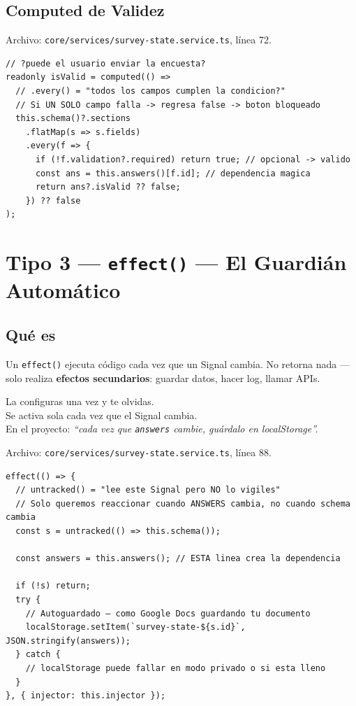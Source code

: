 \documentclass[12pt, a4paper]{article}
\begin{document}
\subsection{ Computed de Validez}
Archivo: \textcolor{morado}{\texttt{core/services/survey-state.service.ts}}, línea 72.

\begin{lstlisting}
// ?puede el usuario enviar la encuesta?
readonly isValid = computed(() =>
  // .every() = "todos los campos cumplen la condicion?"
  // Si UN SOLO campo falla -> regresa false -> boton bloqueado
  this.schema()?.sections
    .flatMap(s => s.fields)
    .every(f => {
      if (!f.validation?.required) return true; // opcional -> valido
      const ans = this.answers()[f.id]; // dependencia magica
      return ans?.isValid ?? false;
    }) ?? false
);
\end{lstlisting}

\section{  Tipo 3 — \texttt{effect()} — El Guardián Automático}

\subsection{ Qué es}
Un \texttt{effect()} ejecuta código cada vez que un Signal cambia.
No retorna nada — solo realiza \textbf{efectos secundarios}: guardar datos, hacer log, llamar APIs.

\begin{tcolorbox}[analogia, title={\emoji{alarm-clock} \emoji{zap} La Alarma Automática}]
  La configuras una vez y te olvidas.\\
  Se activa sola cada vez que el Signal cambia.\\[0.3cm]
  En el proyecto: \textit{``cada vez que \texttt{answers} cambie, guárdalo en localStorage''.}
\end{tcolorbox}

Archivo: \textcolor{morado}{\texttt{core/services/survey-state.service.ts}}, línea 88.

\begin{lstlisting}
effect(() => {
  // untracked() = "lee este Signal pero NO lo vigiles"
  // Solo queremos reaccionar cuando ANSWERS cambia, no cuando schema cambia
  const s = untracked(() => this.schema());

  const answers = this.answers(); // ESTA linea crea la dependencia

  if (!s) return;
  try {
    // Autoguardado — como Google Docs guardando tu documento
    localStorage.setItem(`survey-state-${s.id}`, JSON.stringify(answers));
  } catch {
    // localStorage puede fallar en modo privado o si esta lleno
  }
}, { injector: this.injector });
\end{lstlisting}
\end{document}
